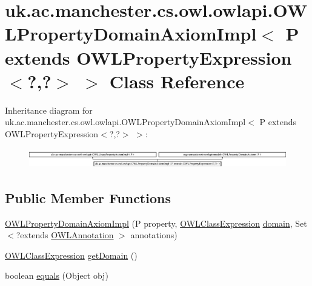 \hypertarget{classuk_1_1ac_1_1manchester_1_1cs_1_1owl_1_1owlapi_1_1_o_w_l_property_domain_axiom_impl_3_01_p_0da3f17a1850e78bb831621c892c6c34a}{\section{uk.\-ac.\-manchester.\-cs.\-owl.\-owlapi.\-O\-W\-L\-Property\-Domain\-Axiom\-Impl$<$ P extends O\-W\-L\-Property\-Expression$<$?,?$>$ $>$ Class Reference}
\label{classuk_1_1ac_1_1manchester_1_1cs_1_1owl_1_1owlapi_1_1_o_w_l_property_domain_axiom_impl_3_01_p_0da3f17a1850e78bb831621c892c6c34a}
}
Inheritance diagram for uk.\-ac.\-manchester.\-cs.\-owl.\-owlapi.\-O\-W\-L\-Property\-Domain\-Axiom\-Impl$<$ P extends O\-W\-L\-Property\-Expression$<$?,?$>$ $>$\-:\begin{figure}[H]
\begin{center}
\leavevmode
\includegraphics[height=0.881890cm]{classuk_1_1ac_1_1manchester_1_1cs_1_1owl_1_1owlapi_1_1_o_w_l_property_domain_axiom_impl_3_01_p_0da3f17a1850e78bb831621c892c6c34a}
\end{center}
\end{figure}
\subsection*{Public Member Functions}
\begin{DoxyCompactItemize}
\item 
\hyperlink{classuk_1_1ac_1_1manchester_1_1cs_1_1owl_1_1owlapi_1_1_o_w_l_property_domain_axiom_impl_3_01_p_0da3f17a1850e78bb831621c892c6c34a_ac587ca0184c2ebf0efa004d2e8b2c771}{O\-W\-L\-Property\-Domain\-Axiom\-Impl} (P property, \hyperlink{interfaceorg_1_1semanticweb_1_1owlapi_1_1model_1_1_o_w_l_class_expression}{O\-W\-L\-Class\-Expression} \hyperlink{classuk_1_1ac_1_1manchester_1_1cs_1_1owl_1_1owlapi_1_1_o_w_l_property_domain_axiom_impl_3_01_p_0da3f17a1850e78bb831621c892c6c34a_ace410220929d89880e86d312bcce8c9f}{domain}, Set$<$?extends \hyperlink{interfaceorg_1_1semanticweb_1_1owlapi_1_1model_1_1_o_w_l_annotation}{O\-W\-L\-Annotation} $>$ annotations)
\item 
\hyperlink{interfaceorg_1_1semanticweb_1_1owlapi_1_1model_1_1_o_w_l_class_expression}{O\-W\-L\-Class\-Expression} \hyperlink{classuk_1_1ac_1_1manchester_1_1cs_1_1owl_1_1owlapi_1_1_o_w_l_property_domain_axiom_impl_3_01_p_0da3f17a1850e78bb831621c892c6c34a_aa97d60e7da0e6b0bb5b2eff3690b0a00}{get\-Domain} ()
\item 
boolean \hyperlink{classuk_1_1ac_1_1manchester_1_1cs_1_1owl_1_1owlapi_1_1_o_w_l_property_domain_axiom_impl_3_01_p_0da3f17a1850e78bb831621c892c6c34a_ae22b098e450e4ab4081b538d0988916f}{equals} (Object obj)
\end{DoxyCompactItemize}

